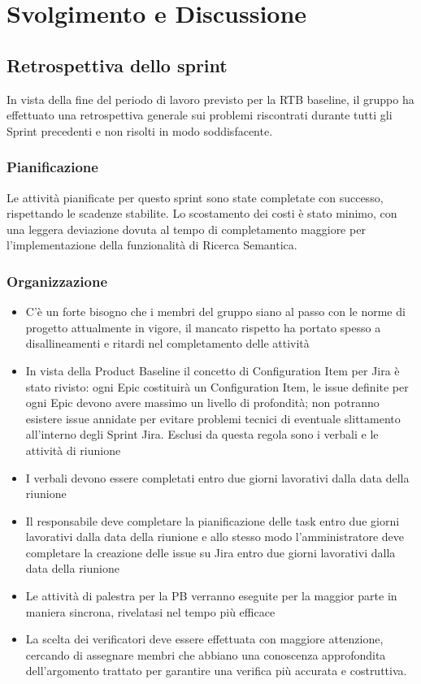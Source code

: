 \documentclass[a4paper,12pt]{article}
\begin{document}
\section{Svolgimento e Discussione}

\subsection{Retrospettiva dello sprint}
In vista della fine del periodo di lavoro previsto per la RTB baseline, il gruppo ha effettuato una retrospettiva generale sui problemi riscontrati durante tutti gli Sprint precedenti e non risolti in modo soddisfacente.

\subsubsection{Pianificazione}
Le attività pianificate per questo sprint sono state completate con successo, rispettando le scadenze stabilite. Lo scostamento dei costi è stato minimo, con una leggera deviazione dovuta al tempo di completamento maggiore per l'implementazione della funzionalità di Ricerca Semantica.

\subsubsection{Organizzazione}
\begin{itemize}
    \item C'è un forte bisogno che i membri del gruppo siano al passo con le norme di progetto attualmente in vigore, il mancato rispetto ha portato spesso a disallineamenti e ritardi nel completamento delle attività
    \item In vista della Product Baseline il concetto di Configuration Item per Jira è stato rivisto: ogni Epic costituirà un Configuration Item, le issue definite per ogni Epic devono avere massimo un livello di profondità; non potranno esistere issue annidate per evitare problemi tecnici di eventuale slittamento all'interno degli Sprint Jira. Esclusi da questa regola sono i verbali e le attività di riunione
    \item I verbali devono essere completati entro due giorni lavorativi dalla data della riunione
    \item Il responsabile deve completare la pianificazione delle task entro due giorni lavorativi dalla data della riunione e allo stesso modo l'amministratore deve completare la creazione delle issue su Jira entro due giorni lavorativi dalla data della riunione
    \item Le attività di palestra per la PB verranno eseguite per la maggior parte in maniera sincrona, rivelatasi nel tempo più efficace
    \item La scelta dei verificatori deve essere effettuata con maggiore attenzione, cercando di assegnare membri che abbiano una conoscenza approfondita dell'argomento trattato per garantire una verifica più accurata e costruttiva.
\end{itemize}
\end{document}
